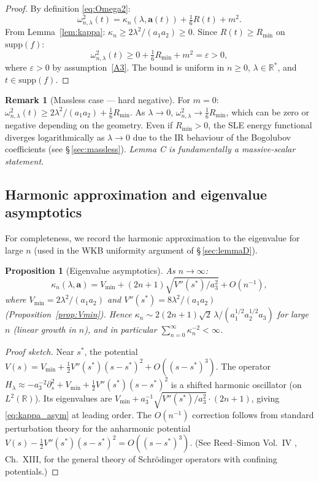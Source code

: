 \documentclass[11pt,a4paper]{article}
\newtheorem{proposition}[theorem]{Proposition}
\theoremstyle{definition}
\newtheorem{remark}[theorem]{Remark}
\newcommand{\R}{\mathbb{R}}
\newcommand{\Lp}{L^2}
\begin{document}
\begin{proof}
By definition \eqref{eq:Omega2}:
\[
  \omega_{n,\lambda}^2(t) = \kappa_n(\lambda, \mathbf{a}(t)) + \tfrac{1}{6}R(t) + m^2.
\]
From Lemma~\ref{lem:kappa}: $\kappa_n \geq 2\lambda^2/(a_1 a_2) \geq 0$.
Since $R(t) \geq R_{\min}$ on $\mathrm{supp}(f)$:
\[
  \omega_{n,\lambda}^2(t) \geq 0 + \tfrac{1}{6}R_{\min} + m^2 = \varepsilon > 0,
\]
where $\varepsilon > 0$ by assumption~\ref{A3}.
The bound is uniform in $n \geq 0$, $\lambda \in \R^*$, and $t \in \mathrm{supp}(f)$.
\end{proof}

\begin{remark}[Massless case --- hard negative]
For $m = 0$: $\omega_{n,\lambda}^2(t) \geq 2\lambda^2/(a_1 a_2) + \tfrac{1}{6}R_{\min}$.
As $\lambda \to 0$, $\omega_{n,\lambda}^2 \to \tfrac{1}{6}R_{\min}$, which can be
zero or negative depending on the geometry.  Even if $R_{\min} > 0$, the SLE
energy functional diverges logarithmically as $\lambda \to 0$ due to the
IR behaviour of the Bogolubov coefficients (see \S\,\ref{sec:massless}).
\emph{Lemma C is fundamentally a massive-scalar statement.}
\end{remark}

\subsection{Harmonic approximation and eigenvalue asymptotics}

For completeness, we record the harmonic approximation to the eigenvalue for
large $n$ (used in the WKB uniformity argument of \S\,\ref{sec:lemmaD}).

\begin{proposition}[Eigenvalue asymptotics]\label{prop:kappa_asym}
As $n \to \infty$:
\begin{equation}\label{eq:kappa_asym}
  \kappa_n(\lambda, \mathbf{a}) = V_{\min} + (2n+1)\sqrt{V''(s^*)/a_3^2} + O(n^{-1}),
\end{equation}
where $V_{\min} = 2\lambda^2/(a_1 a_2)$ and
$V''(s^*) = 8\lambda^2/(a_1 a_2)$ (Proposition~\ref{prop:Vmin}).
Hence $\kappa_n \sim 2(2n+1)\sqrt{2}\,\lambda/(a_1^{1/2}a_2^{1/2}a_3)$ for large $n$
(linear growth in $n$), and in particular $\sum_{n=0}^\infty \kappa_n^{-2} < \infty$.
\end{proposition}

\begin{proof}[Proof sketch]
Near $s^*$, the potential $V(s) = V_{\min} + \tfrac{1}{2}V''(s^*)(s-s^*)^2 + O((s-s^*)^3)$.
The operator $H_\lambda \approx -a_3^{-2}\partial_s^2 + V_{\min} + \tfrac{1}{2}V''(s^*)(s-s^*)^2$
is a shifted harmonic oscillator (on $\Lp(\R)$).  Its eigenvalues are
$V_{\min} + a_3^{-1}\sqrt{V''(s^*)/a_3^2}\cdot(2n+1)$,
giving \eqref{eq:kappa_asym} at leading order.
The $O(n^{-1})$ correction follows from standard perturbation theory for
the anharmonic potential $V(s) - \tfrac{1}{2}V''(s^*)(s-s^*)^2 = O((s-s^*)^3)$.
(See Reed--Simon Vol.~IV \cite{RS4}, Ch.~XIII, for the general theory of
Schr\"odinger operators with confining potentials.)
\end{proof}
\end{document}
